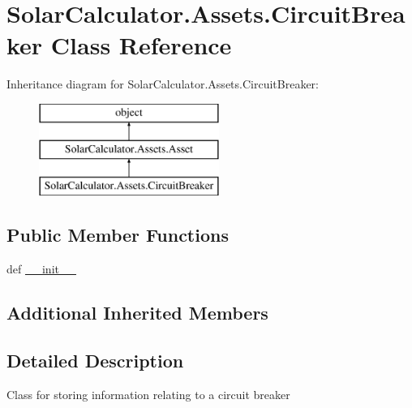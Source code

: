 \hypertarget{class_solar_calculator_1_1_assets_1_1_circuit_breaker}{\section{Solar\-Calculator.\-Assets.\-Circuit\-Breaker Class Reference}
\label{class_solar_calculator_1_1_assets_1_1_circuit_breaker}
}
Inheritance diagram for Solar\-Calculator.\-Assets.\-Circuit\-Breaker\-:\begin{figure}[H]
\begin{center}
\leavevmode
\includegraphics[height=3.000000cm]{class_solar_calculator_1_1_assets_1_1_circuit_breaker}
\end{center}
\end{figure}
\subsection*{Public Member Functions}
\begin{DoxyCompactItemize}
\item 
def \hyperlink{class_solar_calculator_1_1_assets_1_1_circuit_breaker_a586bbce6794a9447e6e6cff6181ec549}{\-\_\-\-\_\-init\-\_\-\-\_\-}
\end{DoxyCompactItemize}
\subsection*{Additional Inherited Members}


\subsection{Detailed Description}
\begin{DoxyVerb}Class for storing information relating to a  circuit breaker \end{DoxyVerb}
 

